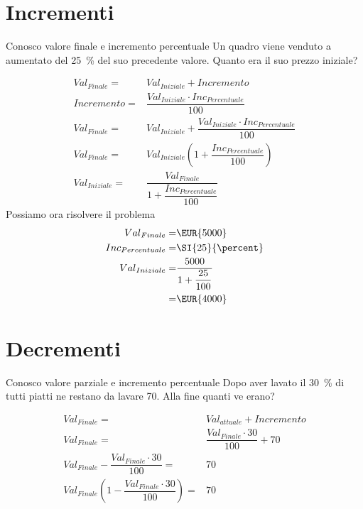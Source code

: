 \section{Incrementi}
	\begin{esempiot}{Conosco valore finale e incremento percentuale}{}
Un quadro viene venduto a   aumentato del \SI{25}{\percent} del suo precedente valore. Quanto era il suo prezzo iniziale?
\end{esempiot}
\begin{align*}
	{Val}_{Finale}=&{Val}_{Iniziale}+Incremento\\
	Incremento=&\dfrac{{Val}_{Iniziale}\cdot {Inc}_{Percentuale} }{100}\\
	{Val}_{Finale}=&{Val}_{Iniziale}+\dfrac{{Val}_{Iniziale}\cdot {Inc}_{Percentuale} }{100}\\
	{Val}_{Finale}=&{Val}_{Iniziale}\left(1+\dfrac{{Inc}_{Percentuale} }{100}\right)\\
	{Val}_{Iniziale}=&\dfrac{{Val}_{Finale}}{1+\dfrac{{Inc}_{Percentuale} }{100}}
\end{align*}
Possiamo ora risolvere il problema
\begin{align*}
	{Val}_{Finale}=&\mbox{\EUR{5000}}\\
	{Inc}_{Percentuale}=&\SI{25}{\percent}\\
	{Val}_{Iniziale}=&\dfrac{5000}{1+\dfrac{25}{100}}\\
	=&\mbox{\EUR{4000}}\\
\end{align*}
\section{Decrementi}
	\begin{esempiot}{Conosco valore parziale e incremento percentuale}{}
Dopo aver lavato il \SI{30}{\percent} di tutti piatti ne restano da lavare \num{70}. Alla fine quanti ve erano?
\end{esempiot}
\begin{align*}
	{Val}_{Finale}=&{Val}_{attuale}+Incremento\\
	{Val}_{Finale}=&\dfrac{{Val}_{Finale}\cdot 30}{100}+70\\
	{Val}_{Finale}-\dfrac{{Val}_{Finale}\cdot 30}{100}=&70\\
	{Val}_{Finale}\left(1-\dfrac{{Val}_{Finale}\cdot 30}{100}\right)=&70\\
\end{align*}